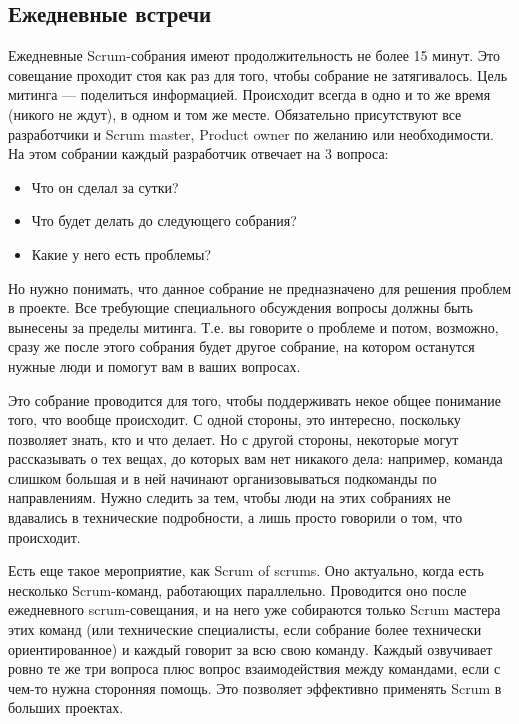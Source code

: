 \documentclass{../../text-style}
\begin{document}
\subsection{Ежедневные встречи}

Ежедневные Scrum-собрания имеют продолжительность не более 15 минут. Это совещание проходит стоя как раз для того, чтобы собрание не затягивалось. Цель митинга --- поделиться информацией. Происходит всегда в одно и то же время (никого не ждут), в одном и том же месте. Обязательно присутствуют все разработчики и Scrum master, Product owner по желанию или необходимости. На этом собрании каждый разработчик отвечает на 3 вопроса:

\begin{itemize}
    \item Что он сделал за сутки? 
    \item Что будет делать до следующего собрания?
    \item Какие у него есть проблемы? 
\end{itemize}

Но нужно понимать, что данное собрание не предназначено для решения проблем в проекте. Все требующие специального обсуждения вопросы должны быть вынесены за пределы митинга. Т.е. вы говорите о проблеме и потом, возможно, сразу же после этого собрания будет другое собрание, на котором останутся нужные люди и помогут вам в ваших вопросах.

Это собрание проводится для того, чтобы поддерживать некое общее понимание того, что вообще происходит. С одной стороны, это интересно, поскольку позволяет знать, кто и что делает. Но с другой стороны, некоторые могут рассказывать о тех вещах, до которых вам нет никакого дела: например, команда слишком большая и в ней начинают организовываться подкоманды по направлениям. Нужно следить за тем, чтобы люди на этих собраниях не вдавались в технические подробности, а лишь просто говорили о том, что происходит.

Есть еще такое мероприятие, как Scrum of scrums. Оно актуально, когда есть несколько Scrum-команд, работающих параллельно. Проводится оно после ежедневного scrum-совещания, и на него уже собираются только Scrum мастера этих команд (или технические специалисты, если собрание более технически ориентированное) и каждый говорит за всю свою команду. Каждый озвучивает ровно те же три вопроса плюс вопрос взаимодействия между командами, если с чем-то нужна сторонняя помощь. Это позволяет эффективно применять Scrum в больших проектах.
\end{document}
